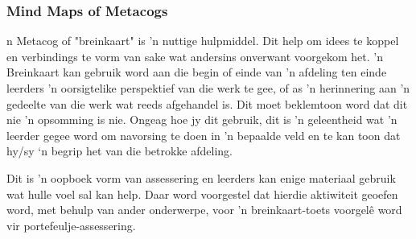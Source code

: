 \subsubsection{Mind Maps of Metacogs}
n Metacog of "breinkaart" is 'n nuttige hulpmiddel. Dit help om idees te koppel en verbindings te vorm van sake wat andersins onverwant voorgekom het. 'n Breinkaart kan gebruik word aan die begin of einde van 'n afdeling ten einde leerders 'n oorsigtelike perspektief van die werk te gee, of as 'n herinnering aan 'n gedeelte van die werk wat reeds afgehandel is. Dit moet beklemtoon word dat dit nie 'n opsomming is nie. Ongeag hoe jy dit gebruik, dit is 'n geleentheid wat 'n leerder gegee word om navorsing te doen in 'n bepaalde veld en te kan toon dat hy/sy ‘n begrip het van die betrokke afdeling.\par

Dit is 'n oopboek vorm van assessering en leerders kan enige materiaal gebruik wat hulle voel sal kan help. Daar word voorgestel dat hierdie aktiwiteit geoefen word, met behulp van ander onderwerpe, voor 'n breinkaart-toets voorgelê word vir portefeulje-assessering.\par

